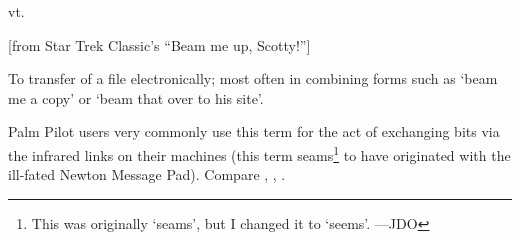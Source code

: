  vt.

[from Star Trek Classic's ``Beam me up, Scotty!'']
\begin{inparaenum}
    \item To transfer  of a file electronically; most often
        in combining forms such as `beam me a copy' or `beam that over to his
        site'.
    \item Palm Pilot users very commonly use this term for the act of exchanging
        bits via the infrared links on their machines (this term
        seams\footnote{This was originally `seams', but I changed it to `seems'.
        ---JDO} to have originated with the ill-fated Newton Message Pad).
        Compare , , .
\end{inparaenum}

